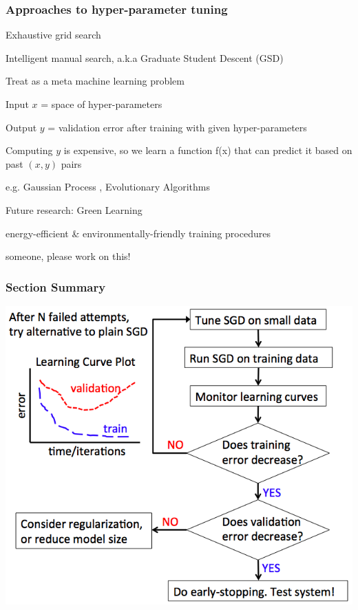 \begin{frame}
\frametitle{Approaches to hyper-parameter tuning}
\be
\item Exhaustive grid search
\pause
\item Intelligent manual search, a.k.a Graduate Student Descent (GSD)
\pause
\item Treat as a meta machine learning problem \cite{bergstra11hyperparam}
	\bi
        \item Input $x$ = space of hyper-parameters
        \item Output $y$ = validation error after training with given hyper-parameters
        \pause
        \item Computing $y$ is expensive, so we learn a function f(x) that can predict it based on past $(x,y)$ pairs
        		\bi
	        \item e.g. Gaussian Process \cite{bergstra11hyperparam}, Evolutionary Algorithms \cite{moriya15automation}
	        \ei
	\ei
\ee
\pause

Future research: {\color{green} Green Learning}
\bi 
\item energy-efficient \& environmentally-friendly training procedures 
\item someone, please work on this!
\ei
\end{frame}

\begin{frame}
\frametitle{Section Summary}
\centerline{\includegraphics[scale=0.42]{figs/training_recipe}}
\end{frame}


